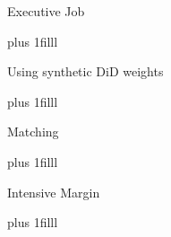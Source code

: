\documentclass[notes,11pt, aspectratio=169]{beamer}
\newcommand{\btVFill}{\vskip0pt plus 1filll}
\begin{document}
\begin{frame}{Executive Job}\label{executivejob}

\btVFill

\hyperlink{nonprofithospexec}{}
    
\end{frame}

\begin{frame}{Using synthetic DiD weights}\label{synthdid_equation}

\btVFill

\hyperlink{est_equation}{}
    
\end{frame}

\begin{frame}{Matching}\label{match_equation}

\btVFill

\hyperlink{est_equation}{}
    
\end{frame}

\begin{frame}{Intensive Margin}\label{int_margin}


    \btVFill

    \hyperlink{main:readrates}{}
\end{frame}
\end{document}
